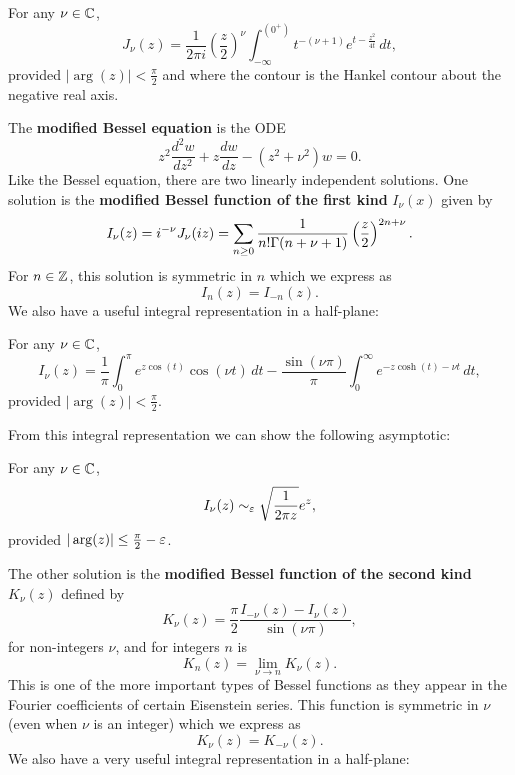     \begin{proposition}
      For any $\nu \in \mathbb{C}$,
      \[
        J_{\nu}(z) = \frac{1}{2\pi i}\left(\frac{z}{2}\right)^{\nu}\int_{-\infty}^{(0^{+})}t^{-(\nu+1)}e^{t-\frac{z^{2}}{4t}}\,dt,
      \]
      provided $|\arg(z)| < \frac{\pi}{2}$ and where the contour is the Hankel contour about the negative real axis.
    \end{proposition}

    The \textbf{modified Bessel equation} is the ODE
    \[
      z^{2}\frac{d^{2}w}{dz^{2}}+z\frac{dw}{dz}-(z^{2}+\nu^{2})w = 0.
    \]
    Like the Bessel equation, there are two linearly independent solutions. One solution is the \textbf{modified Bessel function of the first kind} $I_{\nu}(x)$ given by
    \[
      I_{\nu}(z) = i^{-\nu}J_{\nu}(iz) = \sum_{n \ge 0}\frac{1}{n!\Gamma(n+\nu+1)}\left(\frac{z}{2}\right)^{2n+\nu}.
    \]
    For $n \in \mathbb{Z}$, this solution is symmetric in $n$ which we express as
    \[
      I_{n}(z) = I_{-n}(z).
    \]
    We also have a useful integral representation in a half-plane:

    \begin{proposition}\label{prop:integral_representation_I-Bessel_function}
      For any $\nu \in \mathbb{C}$,
      \[
        I_{\nu}(z) = \frac{1}{\pi}\int_{0}^{\pi}e^{z\cos(t)}\cos(\nu t)\,dt-\frac{\sin(\nu\pi)}{\pi}\int_{0}^{\infty}e^{-z\cosh(t)-\nu t}\,dt,
      \]
      provided $|\arg(z)| < \frac{\pi}{2}$.
    \end{proposition}

    From this integral representation we can show the following asymptotic:

    \begin{lemma}\label{lem:I_Bessel_function_asymptotic}
      For any $\nu \in \mathbb{C}$,
      \[
        I_{\nu}(z) \sim_{\varepsilon} \sqrt{\frac{1}{2\pi z}}e^{z},
      \]
      provided $|\arg(z)| \le \frac{\pi}{2}-\varepsilon$.
    \end{lemma}

    The other solution is the \textbf{modified Bessel function of the second kind} $K_{\nu}(z)$ defined by
    \[
      K_{\nu}(z) = \frac{\pi}{2}\frac{I_{-\nu}(z)-I_{\nu}(z)}{\sin(\nu\pi)},
    \]
    for non-integers $\nu$, and for integers $n$ is
    \[
      K_{n}(z)= \lim_{\nu \to n}K_{\nu}(z).
    \]
    This is one of the more important types of Bessel functions as they appear in the Fourier coefficients of certain Eisenstein series. This function is symmetric in $\nu$ (even when $\nu$ is an integer) which we express as
    \[
      K_{\nu}(z) = K_{-\nu}(z).
    \]
    We also have a very useful integral representation in a half-plane:

